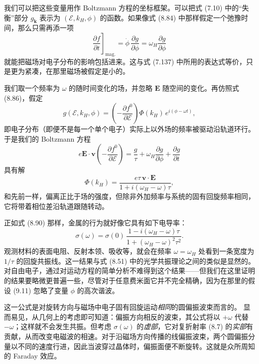 我们可以把这些变量用作 Boltzmann 方程的坐标框架。可以把式 (7.10) 中的“失衡”部分 $g_{\mathbf{k}}$ 表示为 $(\mathcal{E},k_H,\phi)$ 的函数。如果像式 (8.84) 中那样假定一个弛豫时间，那么只需再添一项
\begin{equation*}
\left.\frac{\partial f}{\partial t}\right]_{\text{mag.}}=\dot{\phi}\,\frac{\partial g}{\partial\phi}=\omega_H\frac{\partial g}{\partial\phi} \tag{9.10}
\end{equation*}
就能把磁场对电子分布的影响包括进来。这与式 (7.137) 中所用的表达式等价，只是更为紧凑，在那里磁场被假定是小的。

我们取一个频率为 $\omega$ 的随时间变化的场，并忽略 $\mathbf{E}$ 随空间的变化。再仿照式 (8.86)，假定
\begin{equation*}
g(\mathcal{E},k_H,\phi)=\left(-\frac{\partial f^0}{\partial\mathcal{E}}\right)\Phi(k_H)\,e^{i(\phi-\omega t)}, \tag{9.11}
\end{equation*}
即电子分布（即便不是每一个单个电子）实际上以外场的频率被驱动沿轨道环行。于是我们的 Boltzmann 方程
\begin{equation*}
e\mathbf{E}\cdot\mathbf{v}\left(-\frac{\partial f^0}{\partial\mathcal{E}}\right)=\frac{g}{\tau}+\omega_H\frac{\partial g}{\partial\phi}+\frac{\partial g}{\partial t} \tag{9.12}
\end{equation*}
具有解
\begin{equation*}
\Phi(k_H)=\frac{e\tau\,\mathbf{v}\cdot\mathbf{E}}{1+i(\omega_H-\omega)\tau}, \tag{9.13}
\end{equation*}
和先前一样，偏离正比于场的强度，但除非外加频率与系统的固有回旋频率相同，它将带着相位差沿轨道跟随转动。

正如式 (8.90) 那样，金属的行为就好像它具有如下电导率：
\begin{equation*}
\sigma(\omega)=\sigma(0)\,\frac{1-i(\omega_H-\omega)\tau}{1+(\omega_H-\omega)^{2}\tau^{2}}. \tag{9.14}
\end{equation*}
观测材料的表面电阻、反射本领、吸收等，就会在频率 $\omega=\omega_H$ 处看到一条宽度为 $1/\tau$ 的回旋共振线。这一结果与式 (8.51) 中的光学共振理论之间的类似是显然的。对自由电子，通过对运动方程的简单分析不难得到这个结果——但我们在这里证明的结果要略微更普遍一些，尽管对于任意费米面它并不完全精确，因为在那里的假设 (9.11) 忽略了变量 $\phi$ 的高次谐波。

这一公式是对旋转方向与磁场中电子固有回旋运动\emph{相同}的圆偏振波束而言的。
显而易见，从几何上的考虑即可知道：偏振方向相反的波束，其公式将以 $+\omega$ 代替 $-\omega$；这样就不会发生共振。但考虑 $\sigma(\omega)$ 的\emph{虚部}，它对复折射率 (8.7) 的\emph{实部}有贡献，从而改变电磁波的相速。对于沿磁场方向传播的线偏振波束，两个圆偏振分量以不同的速度行进，因此当波穿过晶体时，偏振面便不断旋转。这就是众所周知的 Faraday 效应。

